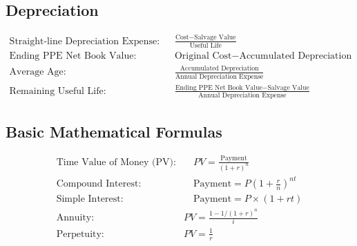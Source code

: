 \documentclass[12pt]{article}
\begin{document}
	\subsection{Depreciation}
\begin{tcolorbox}	
	\begin{align*}
		\text{Straight-line Depreciation Expense:} \quad & \frac{\text{Cost} - \text{Salvage Value}}{\text{Useful Life}} \\
		\text{Ending PPE Net Book Value:} \quad & \text{Original Cost} - \text{Accumulated Depreciation} \\
		\text{Average Age:} \quad & \frac{\text{Accumulated Depreciation}}{\text{Annual Depreciation Expense}} \\
		\text{Remaining Useful Life:} \quad & \frac{\text{Ending PPE Net Book Value} - \text{Salvage Value}}{\text{Annual Depreciation Expense}}
	\end{align*}
\end{tcolorbox}
	\subsection{Basic Mathematical Formulas}
\begin{tcolorbox}
	\begin{align*}
		\text{Time Value of Money (PV):} & \quad PV = \frac{\text{Payment}}{(1 + r)^n} \\
		\text{Compound Interest:} &  \quad \text{Payment} = P \left(1 + \frac{r}{n}\right)^{nt} \\
		\text{Simple Interest:} & \quad \text{Payment} = P \times (1 + rt) \\
		\text{Annuity:} \quad &  PV=\frac{1-1/(1+r)^n}{i} \\
		\text{Perpetuity:} \quad & PV=\frac{1}{r} \\
	\end{align*}
\end{tcolorbox}
\end{document}
